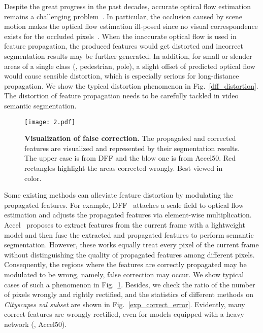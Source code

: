 \documentclass[journal]{IEEEtran}
\begin{document}
Despite the great progress in the past decades, accurate optical flow estimation remains a challenging problem~\cite{liu2019selflow}. In particular, the occlusion caused by scene motion makes the optical flow estimation ill-posed since no visual correspondence exists for the occluded pixels~\cite{neoral2018continual}. When the inaccurate optical flow is used in feature propagation, the produced features would get distorted and incorrect segmentation results may be further generated. In addition, for small or slender areas of a single class (\eg, pedestrian, pole), a slight offset of predicted optical flow would cause sensible distortion, which is especially serious for long-distance propagation. We show the typical distortion phenomenon in Fig.~\ref{dff_distortion}. The distortion of feature propagation needs to be carefully tackled in video semantic segmentation.


\begin{figure}[t]
	\begin{center}
		\texttt{[image: 2.pdf]}
	\end{center}
	\caption{\textbf{Visualization of false correction.} The propagated and corrected features are visualized and represented by their segmentation results. The upper case is from DFF and the blow one is from Accel50. Red rectangles highlight the areas corrected wrongly. Best viewed in color.}
	\label{overly_correction}
\end{figure}


Some existing methods can alleviate feature distortion by modulating the propagated features. For example, DFF~\cite{zhu2017deep} attaches a scale field to optical flow estimation and adjusts the propagated features via element-wise multiplication. Accel~\cite{jain2019accel} proposes to extract features from the current frame with a lightweight model and then fuse the extracted and propagated features to perform semantic segmentation. However, these works equally treat every pixel of the current frame without distinguishing the quality of propagated features among different pixels. Consequently, the regions where the features are correctly propagated may be modulated to be wrong, namely, false correction may occur. We show typical cases of such a phenomenon in Fig.~\ref{overly_correction}. Besides, we check the ratio of the number of pixels wrongly and rightly rectified, and the statistics of different methods on \textit{Cityscapes val subset} are shown in Fig.~\ref{exp_correct_error}. Evidently, many correct features are wrongly rectified, even for models equipped with a heavy network (\eg, Accel50). 
\end{document}
